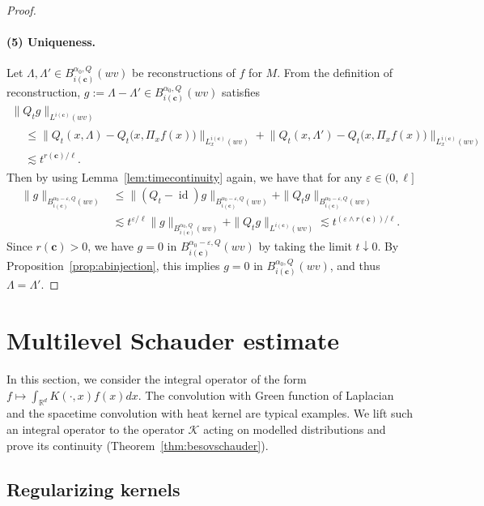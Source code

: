 \documentclass[10pt]{amsart}
\theoremstyle{definition}
\numberwithin{equation}{section}
\newcommand{\bbR}{\mathbb{R}}
\newcommand{\bfc}{\mathbf{c}}
\newcommand{\mcK}{\mathcal{K}}
\DeclareMathOperator{\id}{id}
\begin{document}
\begin{proof}

\paragraph*{(5) Uniqueness.}
Let $\Lambda,\Lambda'\in B_{i(\bfc)}^{\alpha_0,Q}(wv)$ be reconstructions of $f$ for $M$. From the definition of reconstruction, $g:=\Lambda-\Lambda'\in B_{i(\bfc)}^{\alpha_0,Q}(wv)$ satisfies
\begin{multline*}
\|Q_tg\|_{L^{i(\bfc)}(wv)}\\
\begin{aligned}
&\le\big\|Q_t(x,\Lambda)-Q_t\big(x,\Pi_xf(x)\big)\big\|_{L_x^{i(\bfc)}(wv)}+\big\|Q_t(x,\Lambda')-Q_t\big(x,\Pi_xf(x)\big)\big\|_{L_x^{i(\bfc)}(wv)}\\
&\lesssim t^{r(\bfc)/\ell}.
\end{aligned}
\end{multline*}
Then by using Lemma~\ref{lem:timecontinuity} again, we have that for any $\varepsilon\in(0,\ell]$
\begin{align*}
\|g\|_{B_{i(\bfc)}^{\alpha_0-\varepsilon,Q}(wv)}&\le\|(Q_t-\id)g\|_{B_{i(\bfc)}^{\alpha_0-\varepsilon,Q}(wv)}+\|Q_tg\|_{B_{i(\bfc)}^{\alpha_0-\varepsilon,Q}(wv)}\\
&\lesssim t^{\varepsilon/\ell}\|g\|_{B_{i(\bfc)}^{\alpha_0,Q}(wv)}+\|Q_tg\|_{L^{i(\bfc)}(wv)}
\lesssim t^{(\varepsilon\wedge r(\bfc))/\ell}.
\end{align*}
Since $r(\bfc)>0$, we have $g=0$ in $B_{i(\bfc)}^{\alpha_0-\varepsilon,Q}(wv)$ by taking the limit $t\downarrow0$. By Proposition~\ref{prop:abinjection}, this implies $g=0$ in $B_{i(\bfc)}^{\alpha_0,Q}(wv)$, and thus $\Lambda=\Lambda'$.
\end{proof}
\section{Multilevel Schauder estimate}\label{section:schauder}

In this section, we consider the integral operator of the form $f\mapsto \int_{\bbR^d}K(\cdot,x)f(x)dx$. The convolution with Green function of Laplacian and the spacetime convolution with heat kernel are typical examples. We lift such an integral operator to the operator $\mcK$ acting on modelled distributions and prove its continuity (Theorem~\ref{thm:besovschauder}).

\subsection{Regularizing kernels}
\end{document}
